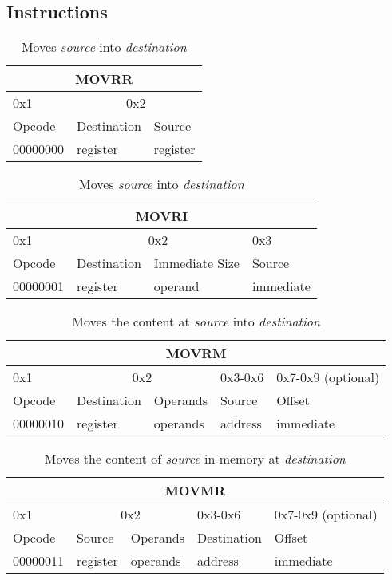 \documentclass{article}
\begin{document}
\subsection{Instructions}
\begin{table}[H]
  \centering
  \begin{tabular} { | p{2cm} | | p{2cm} | p{2cm} |}
    \hline
    \multicolumn{3}{|c|}{MOVRR}\\
    \hline
    0x1 & \multicolumn{2}{|c|}{0x2}\\
    \hline
    Opcode & Destination & Source\\
    00000000 & register & register\\
    \hline
  \end{tabular}
  \caption{Moves \textit{source} into \textit{destination}}
\end{table}

\begin{table}[H]
  \centering
  \begin{tabular} { | p{2cm} | | p{2cm} | p{} | | p{2cm} |}
    \hline
    \multicolumn{4}{|c|}{MOVRI}\\
    \hline
    0x1 & \multicolumn{2}{|c|}{0x2} & 0x3\\
    \hline
    Opcode & Destination & Immediate Size & Source\\
    00000001 & register & operand & immediate\\
    \hline
  \end{tabular}
  \caption{Moves \textit{source} into \textit{destination}}
\end{table}

\begin{table}[H]
  \centering
  \begin{tabular} { | p{2cm} | | p{2cm} | | p{2cm} | | p{2cm} | | p{} | }
    \hline
    \multicolumn{5}{|c|}{MOVRM}\\
    \hline
    0x1 & \multicolumn{2}{c||}{0x2} & 0x3-0x6 & 0x7-0x9 (optional)\\
    \hline
    Opcode & Destination & Operands & Source & Offset\\
    00000010 & register & operands & address & immediate\\
    \hline
  \end{tabular}
  \caption{Moves the content at \textit{source} into \textit{destination}}
\end{table}

\begin{table}[H]
  \centering
  \begin{tabular} { | p{2cm} | | p{2cm} | | p{2cm} | | p{2cm} | | p{} | }
    \hline
    \multicolumn{5}{|c|}{MOVMR}\\
    \hline
    0x1 & \multicolumn{2}{c||}{0x2} & 0x3-0x6 & 0x7-0x9 (optional)\\
    \hline
    Opcode & Source & Operands & Destination & Offset\\
    00000011 & register & operands & address & immediate\\
    \hline
  \end{tabular}
  \caption{Moves the content of \textit{source} in memory at \textit{destination}}
\end{table}
\end{document}
